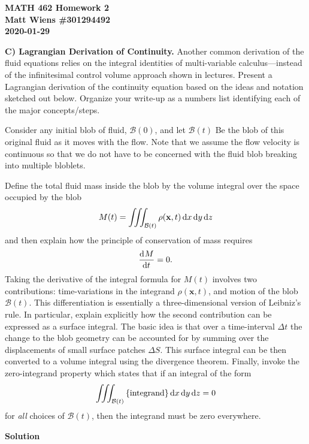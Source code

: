 \documentclass{article}
\def\*#1{\mathbf{#1}}
\newcommand{\B}{\mathcal{B}}
\begin{document}
\textbf{MATH 462 Homework 2} \\
\textbf{Matt Wiens \#301294492} \\
\textbf{2020-01-29}

\textbf{C) Lagrangian Derivation of Continuity.} Another common
derivation of the fluid equations relies on the integral identities of
multi-variable calculus---instead of the infinitesimal control volume
approach shown in lectures. Present a Lagrangian derivation of the
continuity equation based on the ideas and notation sketched out below.
Organize your write-up as a numbers list identifying each of the major
concepts/steps.

Consider any initial blob of fluid, $\B(0)$, and let $\B(t)$ Be the blob
of this original fluid as it moves with the flow. Note that we assume
the flow velocity is continuous so that we do not have to be concerned
with the fluid blob breaking into multiple bloblets.

Define the total fluid mass inside the blob by the volume integral over
the space occupied by the blob
%
\begin{equation*}
    M(t) = \iiint_{\B(t)} \rho(\*x, t) \dif x \dif y \dif z
\end{equation*}
%
and then explain how the principle of conservation of mass requires
%
\begin{equation*}
    \dod{M}{t} = 0
    .
\end{equation*}
%
Taking the derivative of the integral formula for $M(t)$ involves two
contributions: time-variations in the integrand $\rho(\*x, t)$, and
motion of the blob $\B(t)$. This differentiation is essentially a
three-dimensional version of Leibniz's rule. In particular, explain
explicitly how the second contribution can be expressed as a surface
integral. The basic idea is that over a time-interval $\Delta t$ the
change to the blob geometry can be accounted for by summing over the
displacements of small surface patches $\Delta S$. This surface integral
can be then converted to a volume integral using the divergence theorem.
Finally, invoke the zero-integrand property which states that if an
integral of the form
%
\begin{equation*}
    \iiint_{\B(t)} \cbr{\text{integrand}} \dif x \dif y \dif z = 0
\end{equation*}
%
for \textit{all} choices of $\B(t)$, then the integrand must be zero
everywhere.

\textbf{Solution}
\end{document}
